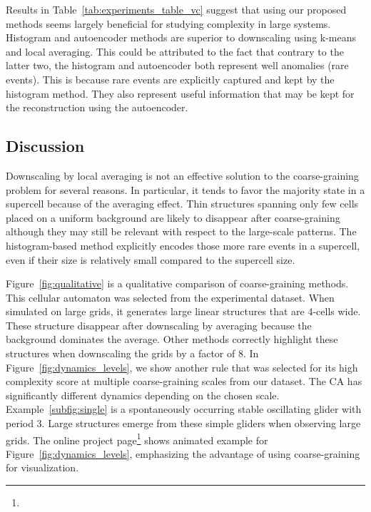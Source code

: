 Results in Table~\ref{tab:experiments_table_vc} suggest that using our proposed methods
seems largely beneficial for studying complexity in large systems.
Histogram and autoencoder methods are superior to downscaling using k-means and
local averaging. This could be attributed to the fact that contrary to the
latter two, the histogram and autoencoder both represent well anomalies (rare
events). This is because rare events are explicitly captured and kept by the
histogram method. They also represent useful information that may be kept for
the reconstruction using the autoencoder.

\subsection{Discussion}\label{sec:discussion}

Downscaling by local averaging is not an effective solution to the
coarse-graining problem for several reasons. In particular, it tends to favor
the majority state in a supercell because of the averaging effect. Thin
structures spanning only few cells placed on a uniform background are likely to
disappear after coarse-graining although they may still be relevant with respect
to the large-scale patterns. The histogram-based method explicitly encodes those
more rare events in a supercell, even if their size is relatively small compared
to the supercell size.

Figure~\ref{fig:qualitative} is a qualitative comparison of coarse-graining
methods. This cellular automaton was selected from the experimental dataset.
When simulated on large grids, it generates large linear structures that are
4-cells wide. These structure disappear after downscaling by averaging because
the background dominates the average. Other methods correctly highlight these
structures when downscaling the grids by a factor of 8. In
Figure~\ref{fig:dynamics_levels}, we show another rule that was selected for its
high complexity score at multiple coarse-graining scales from our dataset. The
CA has significantly different dynamics depending on the chosen scale.
Example~\ref{subfig:single} is a spontaneously occurring stable oscillating
glider with period 3. Large structures emerge from these simple gliders when
observing large grids. The online project page\footnote{\projecturl} shows
animated example for Figure~\ref{fig:dynamics_levels}, emphasizing the advantage
of using coarse-graining for visualization.

